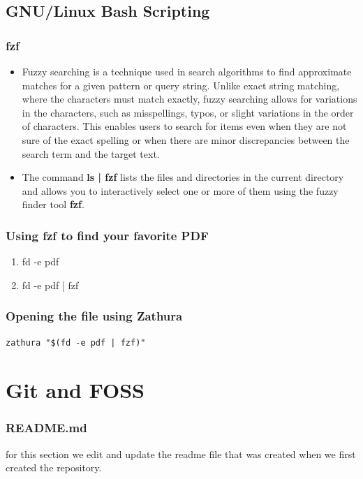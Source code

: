 \documentclass[titlepage]{article}
\begin{document}
\subsection{GNU/Linux Bash Scripting}
\subsubsection{fzf}
\begin{itemize}
\item Fuzzy searching is a technique used in search algorithms to find approximate matches for a given pattern or query string. Unlike exact string matching, where the characters must match exactly, fuzzy searching allows for variations in the characters, such as misspellings, typos, or slight variations in the order of characters. This enables users to search for items even when they are not sure of the exact spelling or when there are minor discrepancies between the search term and the target text.

\item  The command \textbf{ls | fzf } lists the files and directories in the current directory and allows you to interactively select one or more of them using the fuzzy finder tool \textbf {fzf}.
\end{itemize}

\subsubsection{Using fzf to find your favorite PDF}
\begin{enumerate}
\item fd -e pdf

\item fd -e pdf | fzf
\end{enumerate}

\subsubsection{Opening the file using Zathura}
\begin{verbatim}
zathura "$(fd -e pdf | fzf)"
\end{verbatim}

\section{Git and FOSS}
\subsubsection{README.md}
for this section we edit and update the readme file that was created when we first created the repository.
\end{document}

